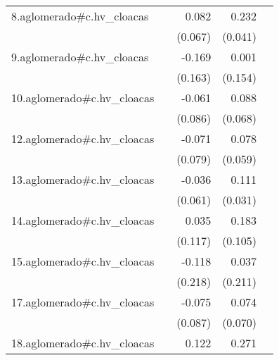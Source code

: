 {\begin{longtable}{l*{4}{D{.}{.}{-1}}}
\addlinespace
8.aglomerado#c.hv\_cloacas&                     &       0.082         &       0.232\sym{***}&                     \\
            &                     &     (0.067)         &     (0.041)         &                     \\
\addlinespace
9.aglomerado#c.hv\_cloacas&                     &      -0.169         &       0.001         &                     \\
            &                     &     (0.163)         &     (0.154)         &                     \\
\addlinespace
10.aglomerado#c.hv\_cloacas&                     &      -0.061         &       0.088         &                     \\
            &                     &     (0.086)         &     (0.068)         &                     \\
\addlinespace
12.aglomerado#c.hv\_cloacas&                     &      -0.071         &       0.078         &                     \\
            &                     &     (0.079)         &     (0.059)         &                     \\
\addlinespace
13.aglomerado#c.hv\_cloacas&                     &      -0.036         &       0.111\sym{***}&                     \\
            &                     &     (0.061)         &     (0.031)         &                     \\
\addlinespace
14.aglomerado#c.hv\_cloacas&                     &       0.035         &       0.183         &                     \\
            &                     &     (0.117)         &     (0.105)         &                     \\
\addlinespace
15.aglomerado#c.hv\_cloacas&                     &      -0.118         &       0.037         &                     \\
            &                     &     (0.218)         &     (0.211)         &                     \\
\addlinespace
17.aglomerado#c.hv\_cloacas&                     &      -0.075         &       0.074         &                     \\
            &                     &     (0.087)         &     (0.070)         &                     \\
\addlinespace
18.aglomerado#c.hv\_cloacas&                     &       0.122         &       0.271\sym{***}&                     \\

\end{longtable}}
